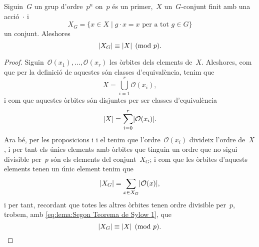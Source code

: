 \documentclass[../../Main.tex]{subfiles}
\begin{document}
	\begin{lemma}
		\label{lema:Segon Teorema de Sylow}
		Siguin~\(G\) un grup d'ordre~\(p^{n}\) on~\(p\) és un primer,~\(X\) un~\(G\)-conjunt finit amb una acció~\(\cdot\) i
		\[
		    X_{G}=\{x\in X\mid g\cdot x=x\text{ per a tot }g\in G\}
		\]
		un conjunt.
		Aleshores
		\[
		    \abs{X_{G}}\equiv\abs{X}\pmod{p}.
		\]
		\begin{proof}
			Siguin~\(\mathcal{O}(x_{1}),\dots,\mathcal{O}(x_{r})\) les òrbites dels elements de~\(X\).
			Aleshores, com que per la definició de  aquestes són classes d'equivalència, tenim que %
			\[
			    X=\bigcup_{i=1}^{r}\mathcal{O}(x_{i}),
			\]
			i com que aquestes òrbites són disjuntes per ser classes d'equivalència
			\begin{equation}
		\label{eq:lema:Segon Teorema de Sylow 1}
			\abs{X}=\sum_{i=0}^{r}\abs{\mathcal{O}(x_{i})}.
			\end{equation}
			Ara bé, per les proposicions  i  i el  tenim que l'ordre~\(\mathcal{O}(x_{i})\) divideix l'ordre de~\(X\), i per tant els únics elements amb òrbites que tinguin un ordre que no sigui divisible per~\(p\) són els elements del conjunt~\(X_{G}\); i com que les òrbites d'aquests elements tenen un únic element tenim que
			\[
			    \abs{X_{G}}=\sum_{x\in X_{G}}\abs{\mathcal{O}(x)},
			\]
			i per tant, recordant que totes les altres òrbites tenen ordre divisible per~\(p\), trobem, amb \eqref{eq:lema:Segon Teorema de Sylow 1}, que
			\[
			    \abs{X_{G}}\equiv\abs{X}\pmod{p}.\qedhere
			\]
		\end{proof}
	\end{lemma}
\end{document}
